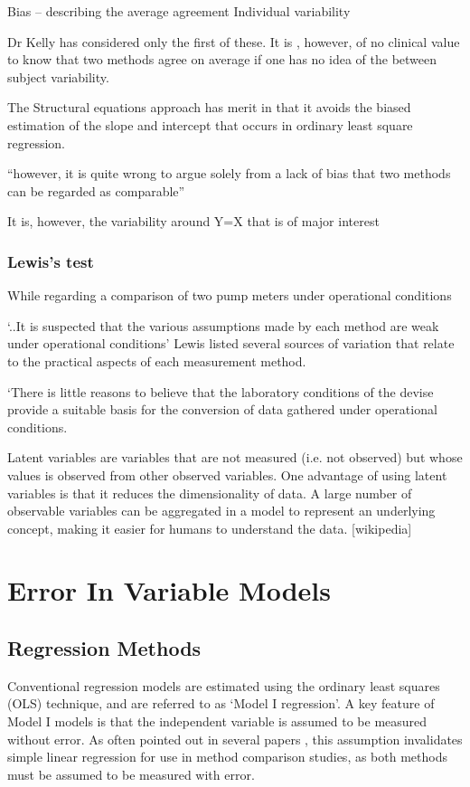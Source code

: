 \documentclass[12pt, a4paper]{report}
\theoremstyle{plain}
\theoremstyle{definition}
\theoremstyle{remark}
\begin{document}
Bias – describing the average agreement
Individual variability


Dr Kelly has considered only the first of these.
It is , however, of no clinical value to know that two methods agree on average if one has no idea of the between subject variability.

The Structural equations approach has merit in that it avoids the biased estimation of the slope and intercept that occurs in ordinary least square regression.

“however, it is quite wrong to argue solely from a lack of bias that two methods can be regarded as comparable”

It is, however, the variability around Y=X that is of major interest



\subsection{Lewis’s test} 
While regarding a comparison of two pump meters under operational conditions

‘..It is suspected that the various assumptions made by each method are weak under operational conditions’
Lewis listed several sources of variation that relate to the practical aspects of each measurement method.

‘There is little reasons to believe that the laboratory conditions of the devise provide a suitable basis for the conversion of data gathered under operational conditions.


Latent variables are variables that are not measured (i.e. not observed) but whose values is observed from other observed variables. One advantage of using latent variables is that it reduces the dimensionality of data. A large number of observable variables can be aggregated in a model to represent an underlying concept, making it easier for humans to understand the data.	[wikipedia]





\chapter{Error In Variable Models}
\section{Regression Methods}
Conventional regression models are estimated using the ordinary least squares (OLS) technique, and are referred to as `Model I regression'\citep{CornCoch,ludbrook97}. A key feature of Model I models is that the independent variable is assumed to be measured
without error. As often pointed out in several papers \citep{BA83,ludbrook97}, this assumption invalidates simple linear
regression for use in method comparison studies, as both methods must be assumed to be measured with error.
\end{document}
